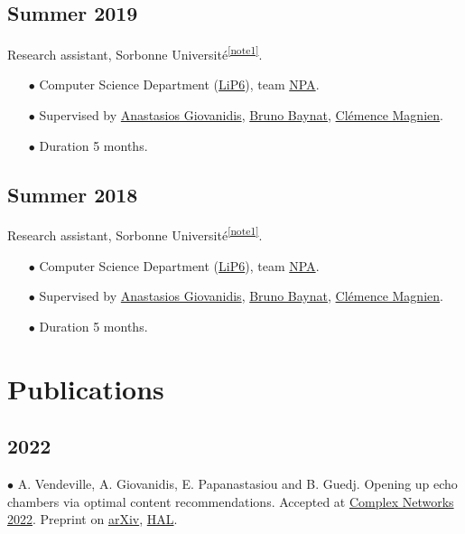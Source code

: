 \documentclass[a4paper,10pt]{article}
\begin{document}
\subsection*{Summer 2019} 
Research assistant, Sorbonne Université\textsuperscript{\ref{note1}}.
\begin{itemize}
	\item[$\bullet$] Computer Science Department (\href{https://www.lip6.fr/}{LiP6}), team \href{https://www-npa.lip6.fr/}{NPA}.
	\item[$\bullet$] Supervised by \href{https://anastasiosgiovanidis.net/}{Anastasios Giovanidis}, \href{https://www.lip6.fr/actualite/personnes-fiche.php?ident=P144}{Bruno Baynat}, \href{https://www-complexnetworks.lip6.fr/~magnien/}{Clémence Magnien}.
	\item[$\bullet$] Duration 5 months.
\end{itemize}

\subsection*{Summer 2018} 
Research assistant, Sorbonne Université\textsuperscript{\ref{note1}}.
\begin{itemize}
	\item[$\bullet$] Computer Science Department (\href{https://www.lip6.fr/}{LiP6}), team \href{https://www-npa.lip6.fr/}{NPA}.
	\item[$\bullet$] Supervised by \href{https://anastasiosgiovanidis.net/}{Anastasios Giovanidis}, \href{https://www.lip6.fr/actualite/personnes-fiche.php?ident=P144}{Bruno Baynat}, \href{https://www-complexnetworks.lip6.fr/~magnien/}{Clémence Magnien}.
	\item[$\bullet$] Duration 5 months.
\end{itemize}

\section*{Publications}

\subsection*{2022}
$\bullet$ A. Vendeville, A. Giovanidis, E. Papanastasiou and B. Guedj. Opening up echo chambers via optimal content recommendations. Accepted at \href{https://complexnetworks.org/}{Complex Networks 2022}. Preprint on \href{https://arxiv.org/abs/2206.03859}{arXiv}, \href{https://hal.archives-ouvertes.fr/hal-03691800v1}{HAL}.
\end{document}
